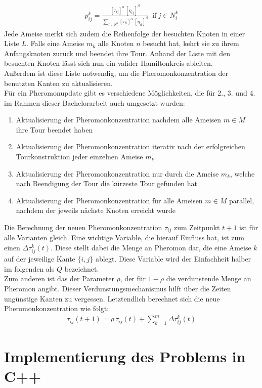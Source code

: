 \documentclass[doktyp=barbeit, sprache=german]{TUBAFarbeiten}
\begin{document}
\begin{align}
\label{eq:Prob}
p^k_{ij} = \frac{[\tau_{ij}]^\alpha \, [\eta_{ij}]^\beta}{\sum\nolimits_{l\in N^k_i} [\tau_{il}]^\alpha \, [\eta_{il}]^\beta} \; \; \text{if}\: j \in N^k_i
\end{align}
Jede Ameise merkt sich zudem die Reihenfolge der besuchten Knoten in einer Liste $L$. Falls eine Ameise $m_k$ alle Knoten $n$ besucht hat, kehrt sie zu ihrem Anfangsknoten zurück und beendet ihre Tour. Anhand der Liste mit den besuchten Knoten lässt sich nun ein valider Hamiltonkreis ableiten. 
\\Außerdem ist diese Liste notwendig, um die Pheromonkonzentration der benutzten Kanten zu aktualisieren.
\\Für ein Pheromonupdate gibt es verschiedene Möglichkeiten, die für 2., 3. und 4. im Rahmen dieser Bachelorarbeit auch umgesetzt wurden: 
\begin{enumerate}
\label{enum:Update}
\item Aktualisierung der Pheromonkonzentration nachdem alle Ameisen $m \in M$ ihre Tour beendet haben
\item Aktualisierung der Pheromonkonzentration iterativ nach der erfolgreichen Tourkonstruktion jeder einzelnen Ameise $m_k$
\item Aktualisierung der Pheromonkonzentration nur durch die Ameise $m_k$, welche nach Beendigung der Tour die kürzeste Tour gefunden hat
\item Aktualisierung der Pheromonkonzentration für alle Ameisen $m \in M$ parallel, nachdem der jeweils nächste Knoten erreicht wurde
\end{enumerate}
Die Berechnung der neuen Pheromonkonzentration $\tau_{ij}$ zum Zeitpunkt $t + 1$ ist für alle Varianten gleich. Eine wichtige Variable, die hierauf Einfluss hat, ist zum einen $\Delta \tau^k_{ij}(t)$. Diese stellt dabei die Menge an Pheromon dar, die eine Ameise $k$ auf der jeweilige Kante $\{i,j\}$ ablegt. Diese Variable wird der Einfachheit halber im folgenden als $Q$ bezeichnet. 
\\Zum anderen ist das der Parameter $\rho$, der für $1-\rho$ die verdunstende Menge an Pheromon angibt. Dieser Verdunstungsmechanismus hilft über die Zeiten ungünstige Kanten zu \glqq vergessen\grqq. Letztendlich berechnet sich die neue Pheromonkonzentration wie folgt:
\begin{align}
\label{eq:Pheromone}
\tau_{ij}(t+1) = \rho \, \tau_{ij}(t) + \sum_{k=1}^m \Delta \tau^k_{ij}(t)
\end{align}
\section{Implementierung des Problems in C++}
\end{document}
